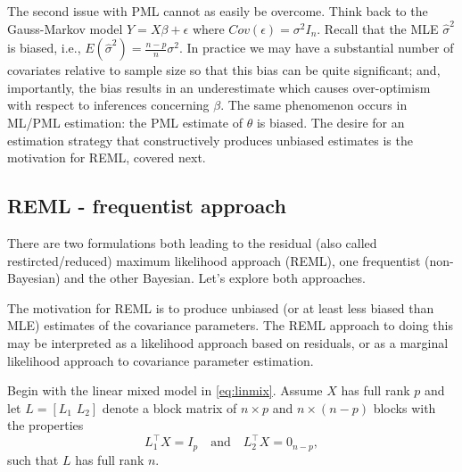 \documentclass[
]{book}
\begin{document}
The second issue with PML cannot as easily be overcome. Think back to the Gauss-Markov model \(Y = X\beta+\epsilon\) where \(Cov(\epsilon) = \sigma^2 I_n\). Recall that the MLE \(\hat\sigma^2\) is biased, i.e., \(E(\hat\sigma^2) = \frac{n-p}{n}\sigma^2\). In practice we may have a substantial number of covariates relative to sample size so that this bias can be quite significant; and, importantly, the bias results in an underestimate which causes over-optimism with respect to inferences concerning \(\beta\). The same phenomenon occurs in ML/PML estimation: the PML estimate of \(\theta\) is biased. The desire for an estimation strategy that constructively produces unbiased estimates is the motivation for REML, covered next.

\hypertarget{reml---frequentist-approach}{%
\subsection{REML - frequentist approach}\label{reml---frequentist-approach}}

There are two formulations both leading to the residual (also called restircted/reduced) maximum likelihood approach (REML), one frequentist (non-Bayesian) and the other Bayesian. Let's explore both approaches.

The motivation for REML is to produce unbiased (or at least less biased than MLE) estimates of the covariance parameters. The REML approach to doing this may be interpreted as a likelihood approach based on residuals, or as a marginal likelihood approach to covariance parameter estimation.

Begin with the linear mixed model in \eqref{eq:linmix}. Assume \(X\) has full rank \(p\) and let \(L = [L_1 \,\,L_2]\) denote a block matrix of \(n\times p\) and \(n\times (n-p)\) blocks with the properties
\[L_1^\top X = I_p \quad\text{and}\quad L_2^\top X = 0_{n-p},\]
such that \(L\) has full rank \(n\).
\end{document}
